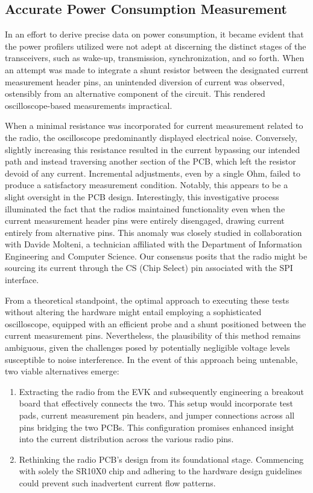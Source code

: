 \subsection{Accurate Power Consumption Measurement}
In an effort to derive precise data on power consumption, it became evident that the power profilers utilized were not adept at discerning the distinct stages of the transceivers, such as wake-up, transmission, synchronization, and so forth. When an attempt was made to integrate a shunt resistor between the designated current measurement header pins, an unintended diversion of current was observed, ostensibly from an alternative component of the circuit. This rendered oscilloscope-based measurements impractical.

When a minimal resistance was incorporated for current measurement related to the radio, the oscilloscope predominantly displayed electrical noise. Conversely, slightly increasing this resistance resulted in the current bypassing our intended path and instead traversing another section of the PCB, which left the resistor devoid of any current. Incremental adjustments, even by a single Ohm, failed to produce a satisfactory measurement condition. Notably, this appears to be a slight oversight in the PCB design. Interestingly, this investigative process illuminated the fact that the radios maintained functionality even when the current measurement header pins were entirely disengaged, drawing current entirely from alternative pins. This anomaly was closely studied in collaboration with Davide Molteni, a technician affiliated with the Department of Information Engineering and Computer Science. Our consensus posits that the radio might be sourcing its current through the CS (Chip Select) pin associated with the SPI interface.

From a theoretical standpoint, the optimal approach to executing these tests without altering the hardware might entail employing a sophisticated oscilloscope, equipped with an efficient probe and a shunt positioned between the current measurement pins. Nevertheless, the plausibility of this method remains ambiguous, given the challenges posed by potentially negligible voltage levels susceptible to noise interference. In the event of this approach being untenable, two viable alternatives emerge:

\begin{enumerate}
  \item Extracting the radio from the EVK and subsequently engineering a breakout board that effectively connects the two. This setup would incorporate test pads, current measurement pin headers, and jumper connections across all pins bridging the two PCBs. This configuration promises enhanced insight into the current distribution across the various radio pins.
  \item Rethinking the radio PCB's design from its foundational stage. Commencing with solely the SR10X0 chip and adhering to the hardware design guidelines could prevent such inadvertent current flow patterns. 
\end{enumerate}



\newpage




